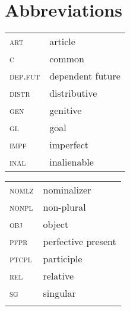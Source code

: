 \documentclass[output=paper]{langsci/langscibook}
\begin{document}
\section*{Abbreviations}
\begin{tabularx}{.45\textwidth}{>{\scshape}lQ} 
art & article\\
c & common\\
dep.fut & dependent future\\
distr & distributive\\
gen & genitive\\
gl & goal\\
impf & imperfect\\
inal & inalienable\\
\end{tabularx}
\begin{tabularx}{.45\textwidth}{>{\scshape}lQ} 
nomlz & nominalizer\\
nonpl & non-plural\\
obj & object\\
pfpr & perfective present\\
ptcpl & participle\\
rel & relative\\
sg & singular\\
\\
\end{tabularx}




 
{\sloppy
\printbibliography[heading=subbibliography,notkeyword=this]
}
\end{document}
